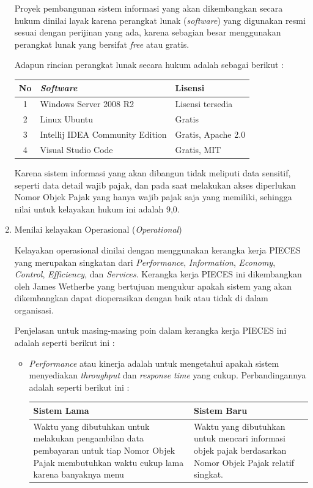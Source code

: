\documentclass[pdftex,12pt, oneside]{article}
\begin{document}
\begin{enumerate}
Proyek pembangunan sistem informasi yang akan dikembangkan secara hukum dinilai layak karena perangkat lunak (\textit{software}) yang digunakan resmi sesuai dengan perijinan yang ada, karena sebagian besar menggunakan perangkat lunak yang bersifat \textit{free} atau gratis.

Adapun rincian perangkat lunak secara hukum adalah sebagai berikut :

\begin{table}[H]
\centering
\begin{tabular}{| c | l | l |}
	\hline
	No & \textit{Software} & Lisensi \\
	\hline
	1 & Windows Server 2008 R2 & Lisensi tersedia \\
	\hline
	2 & Linux Ubuntu & Gratis \\
	\hline
	3 & Intellij IDEA Community Edition & Gratis, Apache 2.0 \\
	\hline
	4 & Visual Studio Code & Gratis, MIT \\
	\hline
	
\end{tabular}
\end{table}

Karena sistem informasi yang akan dibangun tidak meliputi data sensitif, seperti data detail wajib pajak, dan pada saat melakukan akses diperlukan Nomor Objek Pajak yang hanya wajib pajak saja yang memiliki, sehingga nilai untuk kelayakan hukum ini adalah 9,0.
	
	\item Menilai kelayakan Operasional (\textit{Operational})
		
Kelayakan operasional dinilai dengan menggunakan kerangka kerja PIECES yang merupakan singkatan dari \textit{Performance}, \textit{Information}, \textit{Economy}, \textit{Control}, \textit{Efficiency}, dan \textit{Services}. Kerangka kerja PIECES ini dikembangkan oleh James Wetherbe yang bertujuan mengukur apakah sistem yang akan dikembangkan dapat dioperasikan dengan baik atau tidak di dalam organisasi.

Penjelasan untuk masing-masing poin dalam kerangka kerja PIECES ini adalah seperti berikut ini :

\begin{itemize}
	\item \textit{Performance} atau kinerja adalah untuk mengetahui apakah sistem menyediakan \textit{throughput} dan \textit{response time} yang cukup. Perbandingannya adalah seperti berikut ini :
	
	\begin{table}[H]
		\centering
		\begin{tabular}{| p{7cm} | p{7cm} |}
			\hline
			Sistem Lama & Sistem Baru \\
			\hline
			Waktu yang dibutuhkan untuk melakukan pengambilan data pembayaran untuk tiap Nomor Objek Pajak membutuhkan waktu cukup lama karena banyaknya menu & Waktu yang dibutuhkan untuk mencari informasi objek pajak berdasarkan Nomor Objek Pajak relatif singkat. \\
			\hline
		\end{tabular}
	\end{table}
	

\end{itemize}
\end{enumerate}
\end{document}
